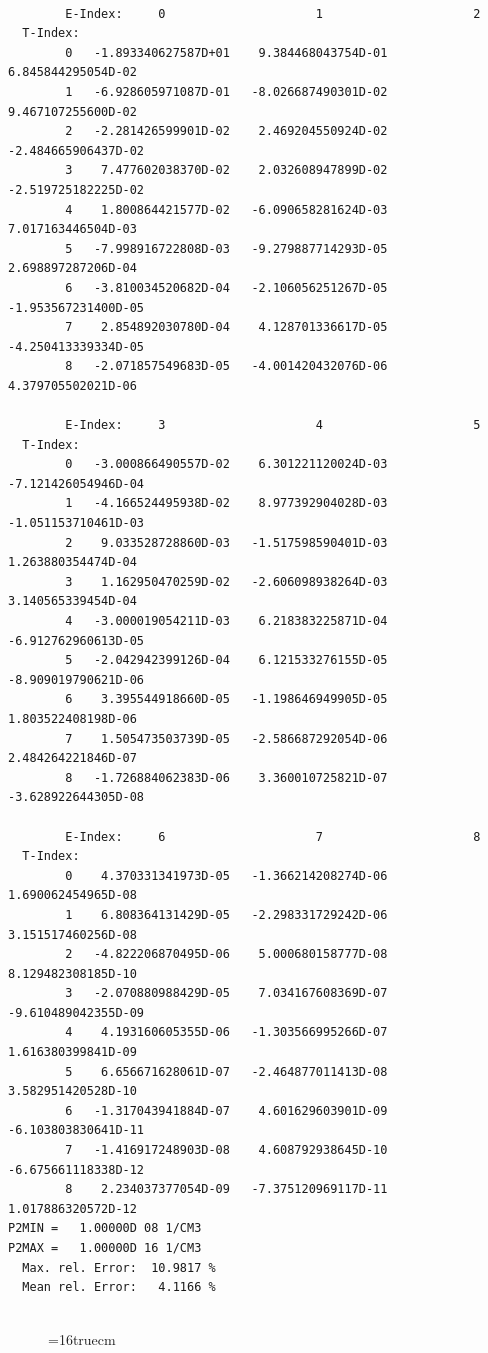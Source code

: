 \documentclass[12pt,dvipdfmx]{article}
\begin{document}
\begin{small}\begin{verbatim}

        E-Index:     0                     1                     2
  T-Index:
        0   -1.893340627587D+01    9.384468043754D-01    6.845844295054D-02
        1   -6.928605971087D-01   -8.026687490301D-02    9.467107255600D-02
        2   -2.281426599901D-02    2.469204550924D-02   -2.484665906437D-02
        3    7.477602038370D-02    2.032608947899D-02   -2.519725182225D-02
        4    1.800864421577D-02   -6.090658281624D-03    7.017163446504D-03
        5   -7.998916722808D-03   -9.279887714293D-05    2.698897287206D-04
        6   -3.810034520682D-04   -2.106056251267D-05   -1.953567231400D-05
        7    2.854892030780D-04    4.128701336617D-05   -4.250413339334D-05
        8   -2.071857549683D-05   -4.001420432076D-06    4.379705502021D-06

        E-Index:     3                     4                     5
  T-Index:
        0   -3.000866490557D-02    6.301221120024D-03   -7.121426054946D-04
        1   -4.166524495938D-02    8.977392904028D-03   -1.051153710461D-03
        2    9.033528728860D-03   -1.517598590401D-03    1.263880354474D-04
        3    1.162950470259D-02   -2.606098938264D-03    3.140565339454D-04
        4   -3.000019054211D-03    6.218383225871D-04   -6.912762960613D-05
        5   -2.042942399126D-04    6.121533276155D-05   -8.909019790621D-06
        6    3.395544918660D-05   -1.198646949905D-05    1.803522408198D-06
        7    1.505473503739D-05   -2.586687292054D-06    2.484264221846D-07
        8   -1.726884062383D-06    3.360010725821D-07   -3.628922644305D-08

        E-Index:     6                     7                     8
  T-Index:
        0    4.370331341973D-05   -1.366214208274D-06    1.690062454965D-08
        1    6.808364131429D-05   -2.298331729242D-06    3.151517460256D-08
        2   -4.822206870495D-06    5.000680158777D-08    8.129482308185D-10
        3   -2.070880988429D-05    7.034167608369D-07   -9.610489042355D-09
        4    4.193160605355D-06   -1.303566995266D-07    1.616380399841D-09
        5    6.656671628061D-07   -2.464877011413D-08    3.582951420528D-10
        6   -1.317043941884D-07    4.601629603901D-09   -6.103803830641D-11
        7   -1.416917248903D-08    4.608792938645D-10   -6.675661118338D-12
        8    2.234037377054D-09   -7.375120969117D-11    1.017886320572D-12
P2MIN =   1.00000D 08 1/CM3
P2MAX =   1.00000D 16 1/CM3
  Max. rel. Error:  10.9817 %
  Mean rel. Error:   4.1166 %


\end{verbatim}\end{small}
\begin{figure} \label{2.2.14b}
\epsfxsize=16truecm
\end{figure}
\newpage
\end{document}
